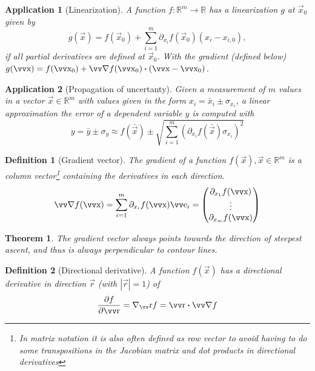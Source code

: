 \documentclass[twocolumn, margin=small]{tex/hsrzf}
\theoremstyle{fuvarzf}
\newtheorem{theorem}{Theorem}
\newtheorem{application}{Application}
\newtheorem{definition}{Definition}
\begin{document}
\begin{application}[Linearization]
  A function \(f: \mathbb{R}^m\to\mathbb{R}\) has a linearization \(g\) at
  \(\vec{x}_0\) given by
  \[
    g(\vec{x}) = f(\vec{x}_0) 
      + \sum_{i=1}^m \partial_{x_i} f(\vec{x}_0)(x_i - x_{i,0}) ,
  \]
  if all partial derivatives are defined at \(\vec{x}_0\). With the gradient
  (defined below) \(g(\vec{x}) = f(\vec{x}_0) + \grad f(\vec{x}_0) \dotp
  (\vec{x} - \vec{x}_0)\).
\end{application}

\begin{application}[Propagation of uncertanty]
  Given a measurement of \(m\) values in a vector \(\vec{x}\in\mathbb{R}^m\)
  with values given in the form \(x_i = \bar{x}_i \pm \sigma_{x_i}\), a linear
  approximation the error of a dependent variable \(y\) is computed with
  \[
    y = \bar{y} \pm \sigma_y \approx f(\bar{\vec{x}})
      \pm \sqrt{\sum_{i=1}^m \left(
        \partial_{x_i} f(\bar{\vec{x}}) \sigma_{x_i}\right)^2}
  \]
\end{application}

\begin{definition}[Gradient vector]
  The \emph{gradient} of a function \(f(\vec{x}), \vec{x}\in\mathbb{R}^m\) is a
  column vector\footnote{In matrix notation it is also often defined as row
  vector to avoid having to do some transpositions in the Jacobian matrix and
  dot products in directional derivatives} containing the derivatives in each
  direction.
  \[
    \grad f (\vec{x}) = \sum_{i=1}^m \partial_{x_i} f(\vec{x}) \vec{e}_i
      = \begin{pmatrix}
        \partial_{x_1} f(\vec{x}) \\
        \vdots \\
        \partial_{x_m} f(\vec{x}) \\
      \end{pmatrix}
  \]
\end{definition}

\begin{theorem}
  The gradient vector always points towards \emph{the direction of steepest
  ascent}, and thus is always perpendicular to contour lines.
\end{theorem}

\begin{definition}[Directional derivative]
  A function \(f(\vec{x})\) has a directional derivative in direction
  \(\vec{r}\) (with \(|\vec{r}|=1\)) of
  \[
    \frac{\partial f}{\partial\vec{r}} 
      = \nabla_\vec{r} f = \vec{r} \dotp \grad f
  \]
\end{definition}
\end{document}
